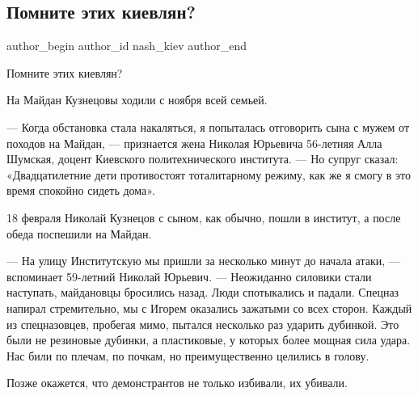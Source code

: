  
 
 
 
 
 
\subsection{Помните этих киевлян?}
\label{sec:22_11_2014.fb.nash_kiev.1.pomnite_etih_kievljan}
 
\ifcmt
 author_begin
   author_id nash_kiev
 author_end
\fi

Помните этих киевлян?

На Майдан Кузнецовы ходили с ноября всей семьей.

— Когда обстановка стала накаляться, я попыталась отговорить сына с мужем от
походов на Майдан, — признается жена Николая Юрьевича 56-летняя Алла Шумская,
доцент Киевского политехнического института. — Но супруг сказал:
«Двадцатилетние дети противостоят тоталитарному режиму, как же я смогу в это
время спокойно сидеть дома».

18 февраля Николай Кузнецов с сыном, как обычно, пошли в институт, а после
обеда поспешили на Майдан.

\begin{multicols}{2}
\end{multicols}

— На улицу Институтскую мы пришли за несколько минут до начала атаки, —
вспоминает 59-летний Николай Юрьевич. — Неожиданно силовики стали наступать,
майдановцы бросились назад. Люди спотыкались и падали. Спецназ напирал
стремительно, мы с Игорем оказались зажатыми со всех сторон. Каждый из
спецназовцев, пробегая мимо, пытался несколько раз ударить дубинкой. Это были
не резиновые дубинки, а пластиковые, у которых более мощная сила удара. Нас
били по плечам, по почкам, но преимущественно целились в голову.

Позже окажется, что демонстрантов не только избивали, их убивали.

